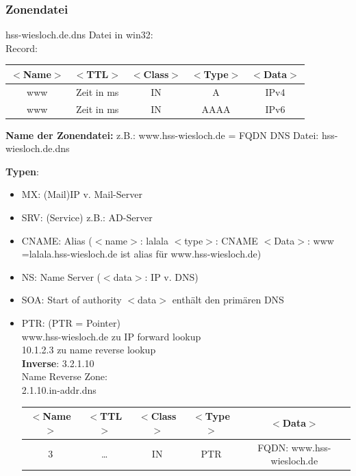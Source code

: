 \documentclass[10pt]{article}
\begin{document}
\subsubsection{Zonendatei}

hss-wiesloch.de.dns Datei in win32:\\
Record:

\begin{tabular}{|c|c|c|c|c|}
\hline
    \(<\)Name\(>\)&\(<\)TTL\(>\)&\(<\)Class\(>\)&\(<\)Type\(>\)&\(<\)Data\(>\)\\\hline
    www&Zeit in ms&IN&A&IPv4\\\hline
    www&Zeit in ms&IN&AAAA&IPv6\\\hline
\end{tabular}

		
\textbf{Name der Zonendatei:}
z.B.: www.hss-wiesloch.de = FQDN
\textrightarrow\space DNS \textrightarrow\space Datei: hss-wiesloch.de.dns



\textbf{Typen}:
\begin{itemize}
    \item MX: (Mail)IP v. Mail-Server
    \item SRV: (Service) z.B.: AD-Server
    \item CNAME: Alias (\(<\)name\(>\): lalala \(<\)type\(>\): CNAME \(<\)Data\(>\): www     =\textrightarrow\space lalala.hss-wiesloch.de ist alias für www.hss-wiesloch.de)
    \item NS: Name Server (\(<\)data\(>\): IP v. DNS)
    \item SOA: Start of authority \textrightarrow\space \(<\)data\(>\) enthält den primären DNS
    \item PTR: (PTR = Pointer)\\
    	www.hss-wiesloch.de  zu IP \textrightarrow\space forward lookup\\
    	10.1.2.3 zu name \textrightarrow\space reverse lookup\\
    	\textbf{Inverse}: 3.2.1.10\\
    Name Reverse Zone:\\
    	2.1.10.in-addr.dns\\
    	\begin{tabular}{|c|c|c|c|c|}
                \hline
                \(<\)Name\(>\)&\(<\)TTL\(>\)&\(<\)Class\(>\)&\(<\)Type\(>\)&\(<\)Data\(>\)\\\hline
                3&…&IN&PTR&FQDN: www.hss-wiesloch.de\\\hline
            \end{tabular}
\end{itemize}
\end{document}
